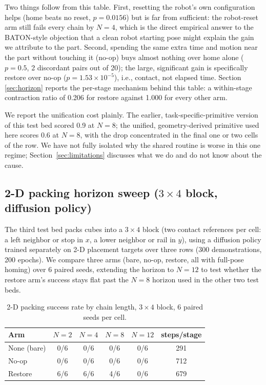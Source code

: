 \documentclass[11pt]{article}
\begin{document}
Two things follow from this table. First, resetting the robot's own
configuration helps (home beats no reset, $p = 0.0156$) but is far from
sufficient: the robot-reset arm still fails every chain by $N=4$, which is
the direct empirical answer to the BATON-style objection that a clean robot
starting pose might explain the gain we attribute to the part. Second,
spending the same extra time and motion near the part without touching it
(no-op) buys almost nothing over home alone ($p=0.5$, 2 discordant pairs
out of 20); the large, significant gain is specifically restore over no-op
($p = 1.53\times10^{-5}$), i.e., contact, not elapsed time. Section
\ref{sec:horizon} reports the per-stage mechanism behind this table: a
within-stage contraction ratio of 0.206 for restore against 1.000 for every
other arm.

We report the unification cost plainly. The earlier, task-specific-primitive
version of this test bed scored 0.9 at $N=8$; the unified, geometry-derived
primitive used here scores 0.6 at $N=8$, with the drop concentrated in the
final one or two cells of the row. We have not fully isolated why the
shared routine is worse in this one regime; Section~\ref{sec:limitations}
discusses what we do and do not know about the cause.

\subsection{2-D packing horizon sweep ($3\times4$ block, diffusion policy)}
\label{sec:packing}
The third test bed packs cubes into a $3\times4$ block (two contact
references per cell: a left neighbor or stop in $x$, a lower neighbor or
rail in $y$), using a diffusion policy trained separately on 2-D placement
targets over three rows (300 demonstrations, 200 epochs). We compare three
arms (bare, no-op, restore, all with full-pose homing) over 6 paired seeds,
extending the horizon to $N=12$ to test whether the restore arm's success
stays flat past the $N=8$ horizon used in the other two test beds.

\begin{table}[h]
\centering
\caption{2-D packing success rate by chain length, $3\times4$ block, 6
paired seeds per cell.}
\label{tab:pack}
\begin{tabular}{lccccc}
\toprule
Arm & $N=2$ & $N=4$ & $N=8$ & $N=12$ & steps/stage \\
\midrule
None (bare)  & 0/6 & 0/6 & 0/6 & 0/6 & 291 \\
No-op        & 0/6 & 0/6 & 0/6 & 0/6 & 712 \\
Restore      & 6/6 & 6/6 & 4/6 & 0/6 & 679 \\
\bottomrule
\end{tabular}
\end{table}
\end{document}
